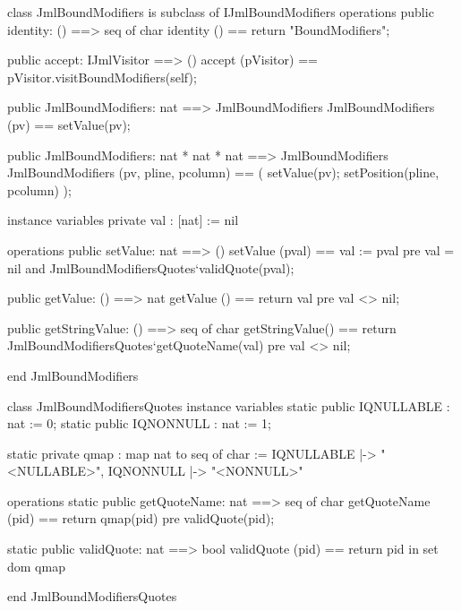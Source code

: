 \begin{vdm_al}
class JmlBoundModifiers is subclass of IJmlBoundModifiers
operations
  public identity: () ==> seq of char
  identity () == return "BoundModifiers";

  public accept: IJmlVisitor ==> ()
  accept (pVisitor) == pVisitor.visitBoundModifiers(self);

  public JmlBoundModifiers: nat ==> JmlBoundModifiers
  JmlBoundModifiers (pv) == setValue(pv);

  public JmlBoundModifiers: nat * nat * nat ==> JmlBoundModifiers
  JmlBoundModifiers (pv, pline, pcolumn) == ( setValue(pv); setPosition(pline, pcolumn) );

instance variables
  private val : [nat] := nil

operations
  public setValue: nat ==> ()
  setValue (pval) == val := pval
    pre val = nil and JmlBoundModifiersQuotes`validQuote(pval);

  public getValue: () ==> nat
  getValue () == return val
    pre val <> nil;

  public getStringValue: () ==> seq of char
  getStringValue() == return JmlBoundModifiersQuotes`getQuoteName(val)
    pre val <> nil;

end JmlBoundModifiers
\end{vdm_al}
\begin{vdm_al}
class JmlBoundModifiersQuotes
instance variables
  static public IQNULLABLE : nat := 0;
  static public IQNONNULL : nat := 1;

  static private qmap : map nat to seq of char :=
    { IQNULLABLE |-> "<NULLABLE>",
      IQNONNULL |-> "<NONNULL>" }

operations
  static public getQuoteName: nat ==> seq of char
  getQuoteName (pid) ==
    return qmap(pid)
    pre validQuote(pid);

  static public validQuote: nat ==> bool
  validQuote (pid) == return pid in set dom qmap

end JmlBoundModifiersQuotes
\end{vdm_al}

